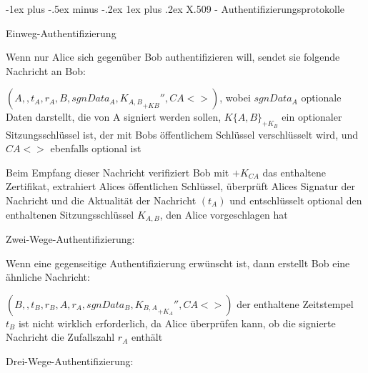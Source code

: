 \documentclass[a4paper]{article}
\makeatletter
\renewcommand{\subsubsection}{\@startsection{subsubsection}{3}{0mm}%
 {-1ex plus -.5ex minus -.2ex}%
 {1ex plus .2ex}%
 {\normalfont\small\bfseries}}
\makeatother
\begin{document}
\begin{multicols}{3}
      \subsubsection{X.509 - Authentifizierungsprotokolle}
      \begin{itemize*}
            \item Einweg-Authentifizierung
            \begin{itemize*}
                  \item Wenn nur Alice sich gegenüber Bob authentifizieren will, sendet sie folgende Nachricht an Bob:
            \end{itemize*}
            \begin{enumerate*}
                  \item $(A,,t_A, r_A, B, sgnData_A, {K_{A,B}}_{+KB}'', CA<>)$, wobei $sgnData_A$ optionale Daten darstellt, die von A signiert werden sollen, $K\{A,B\}_{+K_B}$ ein optionaler Sitzungsschlüssel ist, der mit Bobs öffentlichem Schlüssel verschlüsselt wird, und $CA<>$ ebenfalls optional ist
            \end{enumerate*}
            \begin{itemize*}
                  \item Beim Empfang dieser Nachricht verifiziert Bob mit $+K_{CA}$ das enthaltene Zertifikat, extrahiert Alices öffentlichen Schlüssel, überprüft Alices Signatur der Nachricht und die Aktualität der Nachricht $(t_A)$ und entschlüsselt optional den enthaltenen Sitzungsschlüssel $K_{A,B}$, den Alice vorgeschlagen hat
            \end{itemize*}
            \item Zwei-Wege-Authentifizierung:
            \begin{itemize*}
                  \item Wenn eine gegenseitige Authentifizierung erwünscht ist, dann erstellt Bob eine ähnliche Nachricht:
            \end{itemize*}
            \begin{enumerate*}
                  \setcounter{enumi}{1}
                  \item $(B,,t_B, r_B, A, r_A, sgnData_B,{K_{B,A}}_{+K_A}'', CA<>)$ der enthaltene Zeitstempel $t_B$ ist nicht wirklich erforderlich, da Alice überprüfen kann, ob die signierte Nachricht die Zufallszahl $r_A$ enthält
            \end{enumerate*}
            \item Drei-Wege-Authentifizierung:
            \begin{itemize*}

\end{itemize*}
\end{itemize*}
\end{multicols}
\end{document}
